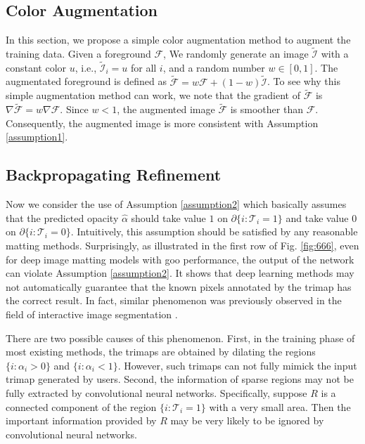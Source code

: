 \documentclass{article}
\theoremstyle{plain}
\begin{document}
\subsection{Color Augmentation}
In this section, we propose a simple color augmentation method to augment the training data.
Given a foreground $\mathcal F$, We randomly generate an image $\tilde{\mathcal I}$ with a constant color $u$, i.e., $\tilde{\mathcal I}_i = u$ for all $i$, and 
a random number $w \in [0,1]$.
The augmentated foreground is defined as $\tilde{ \mathcal F} = w \mathcal F  + (1- w) \tilde{\mathcal I}$.
To see why this simple augmentation method can work, we note that the gradient of $\tilde{\mathcal F}$ is $\nabla \tilde{\mathcal F} = w \nabla \mathcal F$.
Since $w<1$, the augmented image $\tilde{\mathcal F}$ is smoother than $\mathcal F$.
Consequently, the augmented image is more consistent with Assumption \ref{assumption1}.

\subsection{Backpropagating Refinement}




Now we consider the use of Assumption \ref{assumption2}
which
basically assumes that
the predicted opacity $\hat \alpha$ should take value $1$
on $\partial \{i: \mathcal T_i = 1\}$ and take value $0$ on $\partial \{i: \mathcal T_i = 0\}$. 
Intuitively, this assumption should be satisfied 
by any reasonable matting methods.
Surprisingly,
as illustrated in the first row of Fig. \ref{fig:666}, 
even for deep image matting models with goo performance,
the output of the network can violate Assumption \ref{assumption2}.
It shows that deep learning methods may not
automatically
guarantee that the known pixels annotated by the trimap has the correct result.
In fact,
similar phenomenon was previously observed in the field of interactive image segmentation \cite{Jang2019Interactive,Sofiiuk2020Rethinking}.


There are two possible causes of this phenomenon.
First, in the training phase of most existing methods, the trimaps are obtained by dilating the regions $\{i: \alpha_i > 0\}$ and $\{i: \alpha_i < 1\}$.
However, such trimaps can not fully mimick the input trimap generated by users.
Second, 
the information of sparse regions may not be fully extracted by convolutional neural networks.
Specifically, suppose $R$ is a connected component of the region $\{i: \mathcal T_i = 1\}$ with a very small area.
Then the important information provided by $R$ may be very likely to be ignored by convolutional neural networks.
\end{document}
